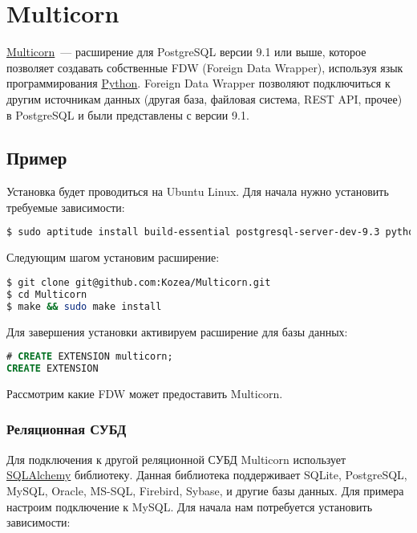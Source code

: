 \section{Multicorn}

\href{http://multicorn.org/}{Multicorn}~--- расширение для PostgreSQL версии 9.1 или выше, которое позволяет создавать собственные FDW (Foreign Data Wrapper), используя язык программирования \href{https://www.python.org/}{Python}. Foreign Data Wrapper позволяют подключиться к другим источникам данных (другая база, файловая система, REST API, прочее) в PostgreSQL и были представлены с версии 9.1.


\subsection{Пример}

Установка будет проводиться на Ubuntu Linux. Для начала нужно установить требуемые зависимости:

\begin{lstlisting}[language=Bash,label=lst:pgmulticorn1,caption=Multicorn]
$ sudo aptitude install build-essential postgresql-server-dev-9.3 python-dev python-setuptools
\end{lstlisting}

Следующим шагом установим расширение:

\begin{lstlisting}[language=Bash,label=lst:pgmulticorn2,caption=Multicorn]
$ git clone git@github.com:Kozea/Multicorn.git
$ cd Multicorn
$ make && sudo make install
\end{lstlisting}

Для завершения установки активируем расширение для базы данных:

\begin{lstlisting}[language=SQL,label=lst:pgmulticorn3,caption=Multicorn]
# CREATE EXTENSION multicorn;
CREATE EXTENSION
\end{lstlisting}

Рассмотрим какие FDW может предоставить Multicorn.


\subsubsection{Реляционная СУБД}

Для подключения к другой реляционной СУБД Multicorn использует \href{http://www.sqlalchemy.org/}{SQLAlchemy} библиотеку. Данная библиотека поддерживает SQLite, PostgreSQL, MySQL, Oracle, MS-SQL, Firebird, Sybase, и другие базы данных. Для примера настроим подключение к MySQL. Для начала нам потребуется установить зависимости:

